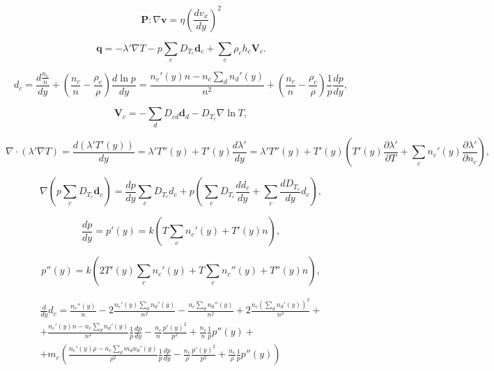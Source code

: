 \documentclass[12pt]{article}
\begin{document}
\begin{equation}
  \mathbf{P} : \nabla \mathbf{v} = \eta \left(\frac{d v_{x}}{d y} \right)^2
\end{equation}

\begin{equation}
  \mathbf{q} = -\lambda' \nabla T - p \sum_{c} D_{T_{c}} \mathbf{d}_{c} + \sum_{c} \rho_{c} h_{c} \mathbf{V}_{c}.
\end{equation}

\begin{equation}
  d_{c} = \frac{d \frac{n_{c}}{n}}{d y} + \left(\frac{n_{c}}{n} - \frac{\rho_{c}}{\rho} \right) \frac{d \ln p}{d y} =
  \frac{n_{c}'(y)n - n_{c}\sum_{d}n_{d}'(y)}{n^2} + \left(\frac{n_{c}}{n} - \frac{\rho_{c}}{\rho} \right)\frac{1}{p} \frac{d p}{d y},
\end{equation}

\begin{equation}
  \mathbf{V}_{c} = -\sum_{d}D_{cd}\mathbf{d}_{d} - D_{T_{c}}\nabla \ln T,
\end{equation}

\begin{equation}
  \nabla \cdot (\lambda' \nabla T) = \frac{d (\lambda' T'(y))}{dy} = \lambda' T''(y) + T'(y) \frac{d \lambda'}{d y} = \lambda' T''(y) + T'(y) \left(T'(y) \frac{\partial \lambda'}{\partial T} + \sum_{c} n_{c}'(y) \frac{\partial \lambda'}{\partial n_{c}} \right),\label{d-lambda-nabla-T}
\end{equation}

\begin{equation}
  \nabla \left(p \sum_{c} D_{T_{c}} \mathbf{d}_{c} \right) = \frac{d p}{d y} \sum_{c} D_{T_{c}} d_{c} + p \left(\sum_{c} D_{T_{c}} \frac{d d_{c}}{d y} + \sum_{c} \frac{d D_{T_{c}}}{d y} d_{c} \right),
\end{equation}

\begin{equation}
  \frac{d p}{d y} = p'(y) = k \left(T\sum_{c} n_{c}'(y) +  T'(y)n \right),
\end{equation}

\begin{equation}
  p''(y) = k \left(2T'(y)\sum_{c} n_{c}'(y) + T\sum_{c} n_{c}''(y) +  T''(y)n\right),
\end{equation}

\begin{multline}
  \frac{d}{dy}d_{c} = \frac{n_{c}''(y)}{n} - 2\frac{n_{c}'(y)\sum_{d}n_{d}'(y)}{n^2} - \frac{n_{c}\sum_{d}n_{d}''(y)}{n^2} + 2\frac{n_{c}\left(\sum_{d}n_{d}'(y) \right)^2}{n^3} + \\
  + \frac{n_{c}'(y)n - n_{c}\sum_{d}n_{d}'(y)}{n^2} \frac{1}{p} \frac{dp}{dy} - \frac{n_{c}}{n} \frac{p'(y)^2}{p^2} + \frac{n_{c}}{n} \frac{1}{p}p''(y) + \\
  + m_{c} \left(\frac{n_{c}'(y)\rho - n_{c}\sum_{d}m_{d}n_{d}'(y)}{\rho^2} \frac{1}{p} \frac{dp}{dy} - \frac{n_{c}}{\rho} \frac{p'(y)^2}{p^2} + \frac{n_{c}}{\rho} \frac{1}{p}p''(y) \right)
\end{multline}
\end{document}
